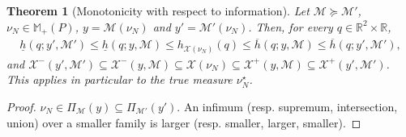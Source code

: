 \documentclass[11pt,a4paper]{article}
\theoremstyle{plain}
\newtheorem{theorem}{Theorem}[section]
\newtheorem{remark}[theorem]{Remark}
\newcommand{\R}{\mathbb{R}}
\newcommand{\X}{\mathcal X}
\begin{document}
\begin{theorem}[Monotonicity with respect to information]
\label{lem:monotone}
    Let $\mathcal M\succeq\mathcal M'$, $\nu_N\in\mathbb M_+(P)$, $y=\mathcal M(\nu_N)$ and $y'=\mathcal M'(\nu_N)$. Then, for every $q\in\R^2\times\R$,
    \begin{align}
        \underline h(q;y',\mathcal M')
        \le
        \underline h(q;y,\mathcal M)
        \le
        h_{\X(\nu_N)}(q)
        \le
        \overline h(q;y,\mathcal M)
        \le
        \overline h(q;y',\mathcal M'),
    \end{align}
    and $\X^-(y',\mathcal M')\subseteq\X^-(y,\mathcal M)\subseteq\X(\nu_N)\subseteq\X^+(y,\mathcal M)\subseteq\X^+(y',\mathcal M')$.
    This applies in particular to the true measure $\nu_N^\star$.
\end{theorem}
\begin{proof}
    $\nu_N\in\Pi_{\mathcal M}(y)\subseteq\Pi_{\mathcal M'}(y')$. An infimum (resp. supremum, intersection, union) over a smaller family is larger (resp. smaller, larger, smaller).
\end{proof}

\end{document}
